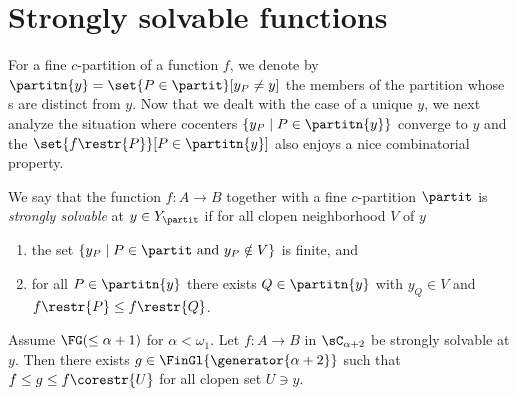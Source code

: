 \section{Strongly solvable functions}
For a fine $c$-partition of a function $f$, we denote by $\partitn{y}=\set{P\in\partit}[y_P\neq y]$ the members of the partition whose \cocenter{}s are distinct from $y$.
Now that we dealt with the case of a unique \cocenter{} $y$, we next analyze the situation where
cocenters $\{y_P\mid P\in\partitn{y}\}$ converge to $y$ and the $\set{f\restr{P}}[P\in\partitn{y}]$ also enjoys a nice combinatorial property.
\begin{definition}
We say that the function $f:A\to B$ together with a fine $c$-partition $\partit$ is \emph{strongly solvable} at $y\in Y_\partit$ if for all clopen neighborhood $V$ of $y$
\begin{enumerate}
\item the set $\{y_P\mid P\in\partit \text{ and } y_P\notin V\}$ is finite, and
\item for all $P\in\partitn{y}$ there exists $Q\in \partitn{y}$ with $y_{Q}\in V$ and $f\restr{P}\leq f\restr{Q}$.
\end{enumerate}
 \end{definition}


\begin{theorem}\label{DiagonalTheorem}
Assume $\FG(\leq\alpha+1)$ for $\alpha<\omega_1$.
Let $f:A \to B$ in $\sC_{\alpha+2}$ be strongly solvable {at $y$}.
Then there exists $g\in \FinGl{\generator{\alpha+2}}$ such that $f\leq g\leq f\corestr{U}$ {for all clopen set $U\ni y$}. 
\end{theorem}

